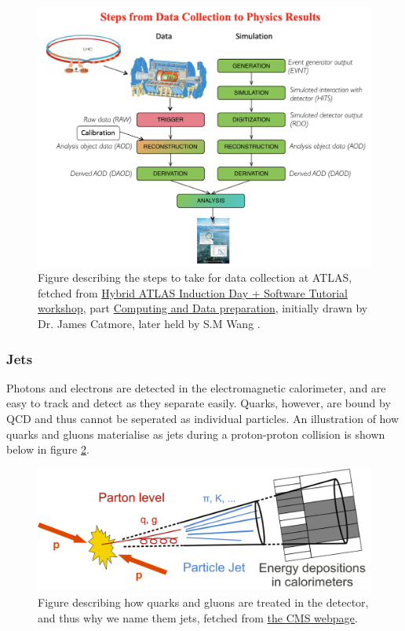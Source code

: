 \begin{figure}[H]
    \includegraphics[width=\linewidth]{Figures/atlas/data_col_phys.png}
    \caption[Steps from data collection to physics results]{Figure describing the steps to take for data collection at ATLAS, fetched from \href{https://indico.cern.ch/event/1159574/timetable/?view=standard}{Hybrid ATLAS Induction Day + Software Tutorial workshop}, part
    \href{https://indico.cern.ch/event/860971/contributions/3672974/attachments/1972049/3280896/Atlas_computing_data_preparation_jan20.pdf}{Computing and Data preparation}, 
    initially drawn by Dr. James Catmore, later held by S.M Wang \cite{Wang:2707056}. }
    \label{fig:atlas_data_col_phys}
\end{figure}


\subsubsection*{Jets}
Photons and electrons are detected in the electromagnetic calorimeter, and are easy to track and detect as they 
separate easily. Quarks, however, are bound by QCD and thus cannot be seperated as individual 
particles. An illustration of how quarks and gluons materialise as jets during a proton-proton 
collision is shown below in figure \ref{fig:cms_jets}.

\begin{figure}[H]
    \includegraphics[width=\linewidth]{Figures/atlas/cms_Sketch_PartonParticleCaloJet.png}
    \caption[Jet produciton from pp-collisions to detector]{Figure describing how quarks and gluons are treated in the detector, and thus why we name them jets, fetched from \href{https://cms.cern/sites/default/files/field/image/Sketch_PartonParticleCaloJet.png}{the CMS webpage}. }
    \label{fig:cms_jets}
\end{figure}

